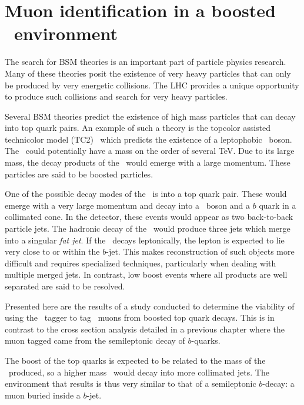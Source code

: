 \newcommand{\kT}{\ensuremath{k_{\textrm{T}}}}
\newcommand{\mzp}{\ensuremath{m_{\Zprime}}}
\newcommand{\eff}[2]{\ensuremath{\epsilon_{#1}^{#2}}}

\chapter{Muon identification in a boosted \ttbar\ environment}\label{ch:Boosted}

The search for BSM theories is an important part of particle physics research. Many of these theories posit the existence of very heavy particles that can only be produced by very energetic collisions. The LHC provides a unique opportunity to produce such collisions and search for very heavy particles. 

Several BSM theories predict the existence of high mass particles that can decay into top quark pairs. An example of such a theory is the topcolor assisted technicolor model (TC2)~\cite{TopQuark:TC2,TopQuark:TC22,TopQuark:ZPrimeCross} which predicts the existence of a leptophobic \Zprime\ boson. The \Zprime\ could potentially have a mass on the order of several \si{TeV}. Due to its large mass, the decay products of the \Zprime\ would emerge with a large momentum. These particles are said to be boosted particles.

One of the possible decay modes of the \Zprime\ is into a top quark pair. These would emerge with a very large momentum and decay into a \W\ boson and a $b$ quark in a collimated cone. In the detector, these events would appear as two back-to-back particle jets. The hadronic decay of the \W\ would produce three jets which merge into a singular \emph{fat jet}. If the \W\ decays leptonically, the lepton is expected to lie very close to or within the $b$-jet. This makes reconstruction of such objects more difficult and requires specialized techniques, particularly when dealing with multiple merged jets. In contrast, low boost events where all products are well separated are said to be resolved.

Presented here are the results of a study conducted to determine the viability of using the \xsm\ tagger to tag \W\ muons from boosted top quark decays. This is in contrast to the cross section analysis detailed in a previous chapter where the muon tagged came from the semileptonic decay of $b$-quarks.

The boost of the top quarks is expected to be related to the mass of the \Zprime\ produced, so a higher mass \Zprime\ would decay into more collimated jets. The environment that results is thus very similar to that of a semileptonic $b$-decay: a muon buried inside a $b$-jet.

